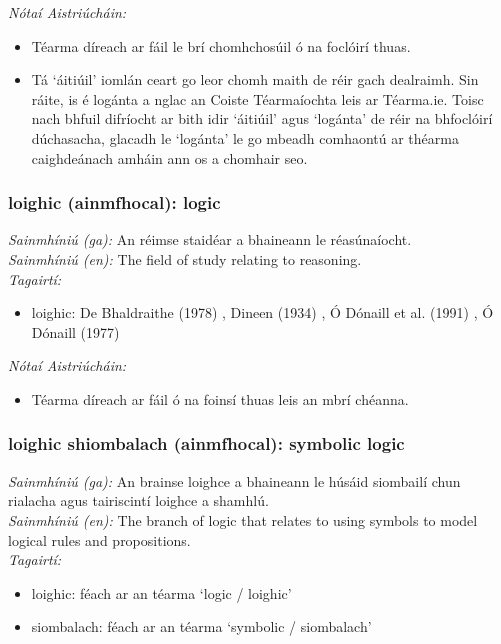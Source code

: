  \noindent \textit{Nótaí Aistriúcháin:}
\begin{itemize}
	\item Téarma díreach ar fáil le brí chomhchosúil ó na foclóirí thuas.
	\item Tá `áitiúil' iomlán ceart go leor chomh maith de réir gach dealraimh. Sin ráite, is é logánta a nglac an Coiste Téarmaíochta leis ar Téarma.ie. Toisc nach bhfuil difríocht ar bith idir `áitiúil' agus `logánta' de réir na bhfoclóirí dúchasacha, glacadh le `logánta' le go mbeadh comhaontú ar théarma caighdeánach amháin ann os a chomhair seo.
\end{itemize}


\subsubsection*{loighic (ainmfhocal): logic}
 \noindent \textit{Sainmhíniú (ga):} An réimse staidéar a bhaineann le réasúnaíocht.
\\
 \noindent \textit{Sainmhíniú (en):} The field of study relating to reasoning.
\\
 \noindent \textit{Tagairtí:}
\begin{itemize}
	\item loighic: De Bhaldraithe (1978) \cite{de-bhaldraithe}, Dineen (1934) \cite{dineen}, Ó Dónaill et al. (1991) \cite{focloir-beag}, Ó Dónaill (1977) \cite{odonaill}
\end{itemize}

 \noindent \textit{Nótaí Aistriúcháin:}
\begin{itemize}
	\item Téarma díreach ar fáil ó na foinsí thuas leis an mbrí chéanna.
\end{itemize}


\subsubsection*{loighic shiombalach (ainmfhocal): symbolic logic}
 \noindent \textit{Sainmhíniú (ga):} An brainse loighce a bhaineann le húsáid siombailí chun rialacha agus tairiscintí loighce a shamhlú.
\\
 \noindent \textit{Sainmhíniú (en):} The branch of logic that relates to using symbols to model logical rules and propositions.
\\
 \noindent \textit{Tagairtí:}
\begin{itemize}
	\item loighic: féach ar an téarma `logic / loighic'
	\item siombalach: féach ar an téarma `symbolic / siombalach'
\end{itemize}

